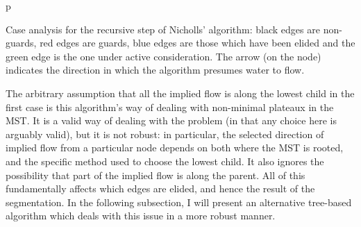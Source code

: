 \begin{stusubfig}{p}
	\hspace{4mm}%
\caption{Case analysis for the recursive step of Nicholls' algorithm: black edges are non-guards, red edges are guards, blue edges are those which have been elided and the green edge is the one under active consideration. The arrow (on the node) indicates the direction in which the algorithm presumes water to flow.}
\label{fig:segmentation-waterfall-nicholls-cases}
\end{stusubfig}

The arbitrary assumption that all the implied flow is along the lowest child in the first case is this algorithm's way of dealing with non-minimal plateaux in the MST. It is a valid way of dealing with the problem (in that any choice here is arguably valid), but it is not robust: in particular, the selected direction of implied flow from a particular node depends on both where the MST is rooted, and the specific method used to choose the lowest child. It also ignores the possibility that part of the implied flow is along the parent. All of this fundamentally affects which edges are elided, and hence the result of the segmentation. In the following subsection, I will present an alternative tree-based algorithm which deals with this issue in a more robust manner.

